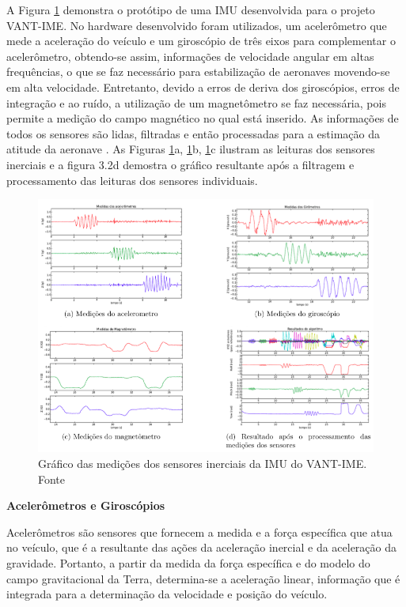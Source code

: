 \documentclass[a4paper, 12pt]{article}
\begin{document}
A Figura \ref{fig:imuVANTIME} demonstra o protótipo de uma IMU desenvolvida para o projeto VANT-IME. No hardware desenvolvido foram utilizados, um acelerômetro que mede a aceleração do veículo e um giroscópio de três eixos para complementar o acelerômetro, obtendo-se assim, informações de velocidade angular em altas frequências, o que se faz necessário para estabilização de aeronaves movendo-se em alta velocidade. Entretanto, devido a erros de deriva dos giroscópios, erros de integração e ao ruído, a utilização de um magnetômetro se faz necessária, pois permite a medição do campo magnético no qual está inserido. As informações de todos os sensores são lidas, filtradas e então processadas para a estimação da atitude da aeronave \cite{Paixao2011}. As Figuras \ref{fig:imuVANTIME}a,  \ref{fig:imuVANTIME}b,  \ref{fig:imuVANTIME}c ilustram as leituras dos sensores inerciais e a figura 3.2d demostra o gráfico resultante após a filtragem e processamento das leituras dos sensores individuais.

\begin{figure}[h]
	\centering
		\includegraphics[scale=0.5]{img/imu_VANTIME.png}
	\caption{Gráfico das medições dos sensores inerciais da IMU do VANT-IME. Fonte \cite{Paixao2011}}
	\label{fig:imuVANTIME}
\end{figure}

\noindent\textbf{Acelerômetros e Giroscópios}

Acelerômetros são sensores que fornecem a medida e a força específica que atua no veículo, que é a resultante das ações da aceleração inercial e da aceleração da gravidade. Portanto, a partir da medida da força específica e do modelo do campo gravitacional da Terra, determina-se a aceleração linear, informação que é integrada para a determinação da velocidade e posição do veículo.
\end{document}
